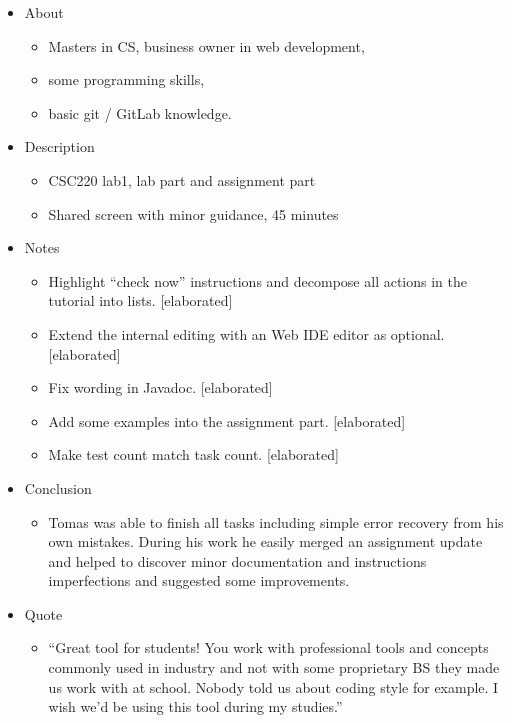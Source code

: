 \begin{itemize}
\item
  {About}
  \begin{itemize}
  \item
    {Masters in CS, business owner in web development,}
  \item
    {some programming skills,}
  \item
    {basic git / GitLab knowledge.}
  \end{itemize}

\item
  {Description}
  \begin{itemize}
  \item
    {CSC220 lab1, lab part and assignment part}
  \item
    {Shared screen with minor guidance, 45 minutes}
  \end{itemize}

\item
  {Notes}
  \begin{itemize}
  \item
    {Highlight ``check now'' instructions and decompose all actions in the tutorial into lists. {[}elaborated{]}}
  \item
    {Extend the internal editing with an Web IDE editor as optional. {[}elaborated{]}}
  \item
    {Fix wording in Javadoc. {[}elaborated{]}}
  \item
    {Add some examples into the assignment part. {[}elaborated{]}}
  \item
    {Make test count match task count. {[}elaborated{]}}
  \end{itemize}

\item
  {Conclusion}
  \begin{itemize}
  \item
    {Tomas was able to finish all tasks including simple error recovery from his own mistakes. During his work he easily merged an assignment update and helped to discover minor documentation and instructions imperfections and suggested some improvements.}
  \end{itemize}

\item
  {Quote}
  \begin{itemize}
  \item
    {``Great tool for students! You work with professional tools and concepts commonly used in industry and not with some proprietary BS they made us work with at school. Nobody told us about coding style for example. I wish we'd be using this tool during my studies.''}
  \end{itemize}
\end{itemize}

